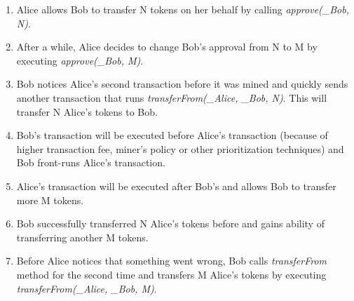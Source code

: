\begin{enumerate}
	\item Alice allows Bob to transfer N tokens on her behalf by calling \textit{approve(\_Bob, N)}.
	\item After a while, Alice decides to change Bob's approval from N to M by executing \textit{approve(\_Bob, M)}.
	\item Bob notices Alice’s second transaction before it was mined and quickly sends another transaction that runs \textit{transferFrom(\_Alice, \_Bob, N)}. This will transfer N Alice’s tokens to Bob.
	\item Bob’s transaction will be executed before Alice’s transaction (because of higher transaction fee, miner’s policy or other prioritization techniques) and Bob front-runs Alice’s transaction.
	\item Alice’s transaction will be executed after Bob’s and allows Bob to transfer more M tokens.
	\item Bob successfully transferred N Alice’s tokens before and gains ability of transferring another M tokens.
	\item Before Alice notices that something went wrong, Bob calls \textit{transferFrom} method for the second time and transfers M Alice’s tokens by executing \textit{transferFrom(\_Alice, \_Bob, M)}.\newline
\end{enumerate}

